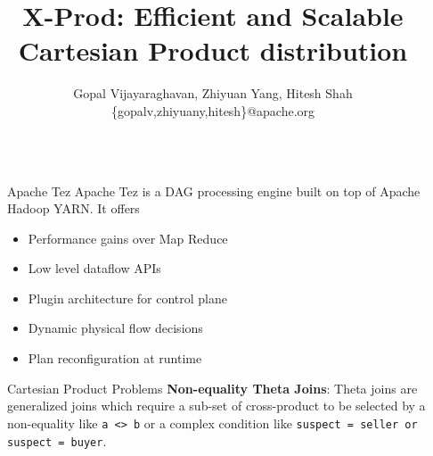 \documentclass[final]{beamer}
\title{X-Prod: Efficient and Scalable Cartesian Product distribution} %
\author{
Gopal Vijayaraghavan, Zhiyuan Yang, Hitesh Shah \\ 
\{gopalv,zhiyuany,hitesh\}@apache.org
} %
\institute{Apache Tez} %
\newlength{\sepwid}
\newlength{\onecolwid}
\begin{document}

\setlength{\belowcaptionskip}{2ex} %
\setlength\belowdisplayshortskip{2ex} %

\begin{frame}[t] %

\begin{columns}[t] %

\begin{column}{\sepwid}\end{column} %

\begin{column}{\onecolwid} %


\begin{alertblock}{Apache Tez}
Apache Tez is a DAG processing engine built on top of Apache Hadoop YARN. It offers
\begin{itemize}
\item Performance gains over Map Reduce 
\item Low level dataflow APIs
\item Plugin architecture for control plane
\item Dynamic physical flow decisions
\item Plan reconfiguration at runtime 
\end{itemize}

\end{alertblock}


\begin{block}{Cartesian Product Problems}
\textbf{Non-equality Theta Joins}:
Theta joins are generalized joins which require a sub-set of cross-product to be selected by 
a non-equality like \texttt{a <> b} or a complex condition like \texttt{suspect = seller or suspect = buyer}.


\end{block}
\end{column}
\end{columns}
\end{frame}
\end{document}
